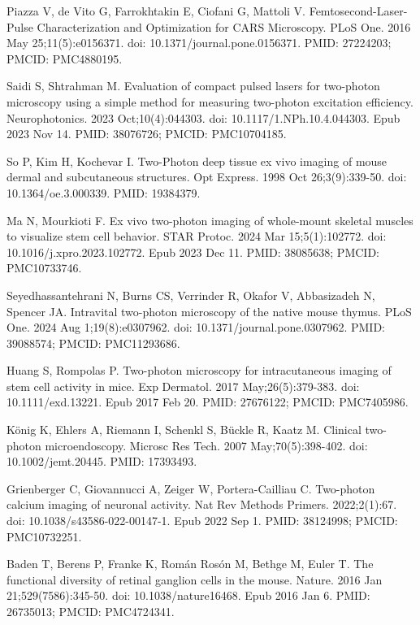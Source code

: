 \documentclass[10pt,letterpaper]{article}
\begin{document}
\begin{thebibliography}{10}
Piazza V, de Vito G, Farrokhtakin E, Ciofani G, Mattoli V. Femtosecond-Laser-Pulse Characterization and Optimization for CARS Microscopy. PLoS One. 2016 May 25;11(5):e0156371. doi: 10.1371/journal.pone.0156371. PMID: 27224203; PMCID: PMC4880195.

Saidi S, Shtrahman M. Evaluation of compact pulsed lasers for two-photon microscopy using a simple method for measuring two-photon excitation efficiency. Neurophotonics. 2023 Oct;10(4):044303. doi: 10.1117/1.NPh.10.4.044303. Epub 2023 Nov 14. PMID: 38076726; PMCID: PMC10704185.

So P, Kim H, Kochevar I. Two-Photon deep tissue ex vivo imaging of mouse dermal and subcutaneous structures. Opt Express. 1998 Oct 26;3(9):339-50. doi: 10.1364/oe.3.000339. PMID: 19384379.

Ma N, Mourkioti F. Ex vivo two-photon imaging of whole-mount skeletal muscles to visualize stem cell behavior. STAR Protoc. 2024 Mar 15;5(1):102772. doi: 10.1016/j.xpro.2023.102772. Epub 2023 Dec 11. PMID: 38085638; PMCID: PMC10733746.

Seyedhassantehrani N, Burns CS, Verrinder R, Okafor V, Abbasizadeh N, Spencer JA. Intravital two-photon microscopy of the native mouse thymus. PLoS One. 2024 Aug 1;19(8):e0307962. doi: 10.1371/journal.pone.0307962. PMID: 39088574; PMCID: PMC11293686.

Huang S, Rompolas P. Two-photon microscopy for intracutaneous imaging of stem cell activity in mice. Exp Dermatol. 2017 May;26(5):379-383. doi: 10.1111/exd.13221. Epub 2017 Feb 20. PMID: 27676122; PMCID: PMC7405986.

K\"onig K, Ehlers A, Riemann I, Schenkl S, Bückle R, Kaatz M. Clinical two-photon microendoscopy. Microsc Res Tech. 2007 May;70(5):398-402. doi: 10.1002/jemt.20445. PMID: 17393493.

Grienberger C, Giovannucci A, Zeiger W, Portera-Cailliau C. Two-photon calcium imaging of neuronal activity. Nat Rev Methods Primers. 2022;2(1):67. doi: 10.1038/s43586-022-00147-1. Epub 2022 Sep 1. PMID: 38124998; PMCID: PMC10732251.

Baden T, Berens P, Franke K, Román Rosón M, Bethge M, Euler T. The functional diversity of retinal ganglion cells in the mouse. Nature. 2016 Jan 21;529(7586):345-50. doi: 10.1038/nature16468. Epub 2016 Jan 6. PMID: 26735013; PMCID: PMC4724341.


\end{thebibliography}
\end{document}
